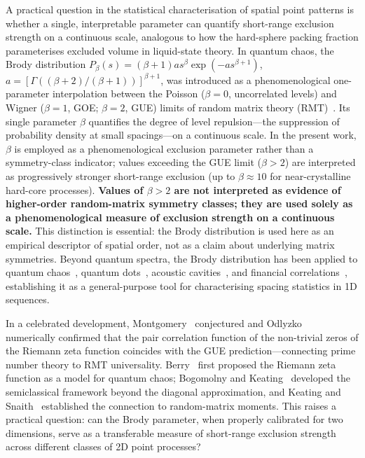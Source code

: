 \documentclass[final,3p,times,twocolumn]{elsarticle}
\theoremstyle{definition}
\begin{document}
A practical question in the statistical characterisation of spatial
point patterns is whether a single, interpretable parameter can
quantify short-range exclusion strength on a continuous scale,
analogous to how the hard-sphere packing fraction parameterises
excluded volume in liquid-state theory. In quantum chaos,
the Brody distribution
$P_\beta(s) = (\beta+1) a s^\beta \exp(-a s^{\beta+1})$,
$a = [\Gamma((\beta+2)/(\beta+1))]^{\beta+1}$,
was introduced as a phenomenological one-parameter interpolation
between the Poisson ($\beta=0$, uncorrelated levels) and Wigner
($\beta=1$, GOE; $\beta=2$, GUE) limits of random matrix theory
(RMT)~\cite{BRODY-1981}. Its single parameter
$\beta$ quantifies the degree of level repulsion---the suppression
of probability density at small spacings---on a continuous scale. In the present work, $\beta$ is employed
as a phenomenological exclusion parameter rather than a
symmetry-class indicator; values exceeding the GUE limit
($\beta>2$) are interpreted as progressively stronger
short-range exclusion (up to $\beta\approx 10$ for near-crystalline
hard-core processes). \textbf{Values of $\beta>2$ are not interpreted
as evidence of higher-order random-matrix symmetry classes; they are
used solely as a phenomenological measure of exclusion strength on a
continuous scale.} This distinction is essential: the Brody
distribution is used here as an empirical descriptor of spatial
order, not as a claim about underlying matrix symmetries.
Beyond quantum spectra, the Brody distribution has been applied
to quantum chaos~\cite{STOCKMANN-1999}, quantum dots~\cite{ALHASSID-2000},
acoustic cavities~\cite{WEAVER-1989}, and financial
correlations~\cite{LALOUX-1999}, establishing it as a general-purpose
tool for characterising spacing statistics in 1D sequences.

In a celebrated development, Montgomery~\cite{MONTGOMERY-1973} conjectured
and Odlyzko~\cite{ODLYZKO-1987} numerically confirmed that the pair
correlation function of the non-trivial zeros of the Riemann zeta
function coincides with the GUE prediction---connecting prime number
theory to RMT universality. Berry~\cite{BERRY-1986} first proposed the
Riemann zeta function as a model for quantum chaos; Bogomolny and
Keating~\cite{BOGOMOLNY-1996} developed the semiclassical framework
beyond the diagonal approximation, and Keating and
Snaith~\cite{KEATING-1999} established the connection to random-matrix
moments.
This raises a practical question: can the Brody parameter, when
properly calibrated for two dimensions, serve as a transferable
measure of short-range exclusion strength across different classes
of 2D point processes?
\end{document}
